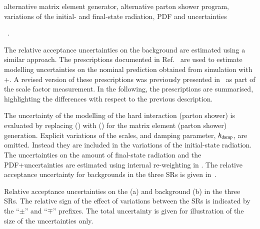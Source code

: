 alternative matrix element generator, alternative parton shower program,
variations of the initial- and final-state radiation, PDF and \alphas
uncertainties


~.



The relative acceptance uncertainties on the \ttbar background are estimated
using a similar approach. The prescriptions documented in
Ref.~\cite{ATL-PHYS-PUB-2020-023} are used to estimate modelling uncertainties
on the nominal prediction obtained from simulation with
\POWHEGBOX[v2]+\PYTHIA[8]. A revised version of these prescriptions was
previously presented in~ as part of the
\ttbarFakes scale factor measurement. In the following, the prescriptions are
summarised, highlighting the differences with respect to the previous
description.

The uncertainty of the modelling of the hard interaction (parton shower) is
evaluated by replacing \POWHEGBOX[v2] (\PYTHIA[8]) with \MGNLO (\HERWIG[7]) for
the matrix element (parton shower) generation. Explicit variations of the
scales, and \PYTHIA[8] damping parameter, $h_\mathrm{damp}$, are omitted. Instead they
are included in the variations of the initial-state radiation. The uncertainties
on the amount of final-state radiation and the PDF+\alphas uncertainties are
estimated using internal re-weighting in \PYTHIA[8]. The relative acceptance
uncertainty for \ttbar backgrounds in the three SRs is given
in~.

\begin{table}[htbp]
  \centering

  \caption{Relative acceptance uncertainties on the \ZHF (a) and \ttbar
    background (b) in the three SRs. The relative sign of the effect of
    variations between the SRs is indicated by the ``$\pm$'' and ``$\mp$''
    prefixes. The total uncertainty is given for illustration of the size of the
    uncertainties only.}

  \begin{subtable}[t]{0.95\textwidth}
    \centering
    \label{tab:uncertainties_zhf_extrapol}

    
  \end{subtable}

  \vspace{10pt}

  \begin{subtable}[t]{0.95\textwidth}
    \centering
    \label{tab:uncertainties_ttbar_extrapol}

    
  \end{subtable}
\end{table}

